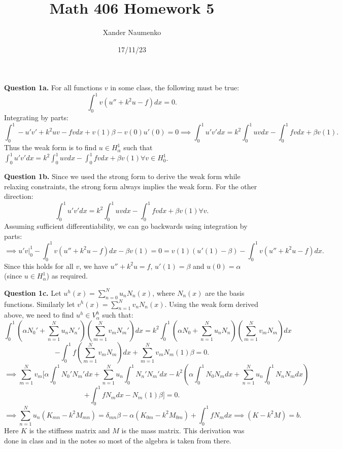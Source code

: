 \documentclass[letterpaper, reqno,11pt]{article}
\begin{document}
\title{Math 406 Homework 5}
\date{17/11/23}
\author{Xander Naumenko}
\maketitle

{\medskip\noindent\bf Question 1a.} For all functions $v$ in some class, the following must be true:
\[
\int_{0}^{1}v(u''+k^2u-f)dx=0
.\]
Integrating by parts:
\[
\int_0^{1}-u'v'+k^2uv-fvdx+v(1)\beta-v(0)u'(0)=0\implies \int_0^{1}u'v'dx=k^2\int_0^{1}uvdx-\int_0^{1}fvdx+\beta v(1)
.\]
Thus the weak form is to find $u\in H_\alpha^{1}$ such that $\int_0^{1}u'v'dx=k^2\int_0^{1}uvdx-\int_0^{1}fvdx+\beta v(1)\forall v\in H_0^{1}$.

{\medskip\noindent\bf Question 1b.} Since we used the strong form to derive the weak form while relaxing constraints, the strong form always implies the weak form. For the other direction:
\[
\int_{0}^{1}u'v'dx=k^2\int_0^{1}uvdx-\int_0^{1}fvdx+\beta v(1)\forall v
.\]
Assuming sufficient differentiability, we can go backwards using integration by parts:
\[
\implies u'v\bigg|_0^{1}-\int_0^{1}v\left( u''+k^2u-f \right) dx-\beta v(1)=0=v(1)\left( u'(1)-\beta \right) -\int_0^{1}v\left( u''+k^2u-f \right) dx
.\]
Since this holds for all $v$, we have $u''+k^2u=f$, $u'(1)=\beta$ and $u(0)=\alpha$ (since $u\in H_\alpha^{1}$) as required.

{\medskip\noindent\bf Question 1c.} Let $u^{h}(x)=\sum_{n=0}^{N}u_nN_n(x)$, where $N_n(x)$ are the basis functions. Similarly let $v^{h}(x)=\sum_{n=1}^{N}v_nN_n(x)$. Using the weak form derived above, we need to find $u^{h}\in V_\alpha^{h}$ such that:
\[
\int_0^{1}\left(\alpha N_0'+\sum_{n=1}^{N}u_nN_n'\right)\left( \sum_{m=1}^{N}v_mN_m' \right) dx=k^2\int_0^{1}\left( \alpha N_0+\sum_{n=1}^{N}u_nN_n \right) \left( \sum_{m=1}^{N}v_mN_m \right) dx
\]
\[
-\int_0^{1}f\left( \sum_{m=1}^{N}v_mN_m \right) dx+\sum_{m=1}^{N}v_m N_m(1)\beta=0
.\]
\[
    \implies\sum_{m=1}^{N}v_m\bigg[\alpha\int_0^{1}N_0' N_m'dx+\sum_{n=1}^{N}u_n\int_0^{1}N_n' N_m'dx-k^2\left( \alpha\int_0^{1} N_0 N_m dx+\sum_{n=1}^{N}u_n\int_0^{1}N_n N_m dx \right) 
\]
\[
+\int_0^{1}fN_mdx-N_m(1)\beta\bigg]=0
.\]
\[
\implies\sum_{n=1}^{N}u_n(K_{mn}-k^2M_{mn})=\delta_{mn}\beta-\alpha(K_{0m}-k^2M_{0m})+\int_0^{1}fN_mdx\implies (K-k^2M)=b
.\]
Here $K$ is the stiffness matrix and $M$ is the mass matrix. This derivation was done in class and in the notes so most of the algebra is taken from there.
\end{document}
